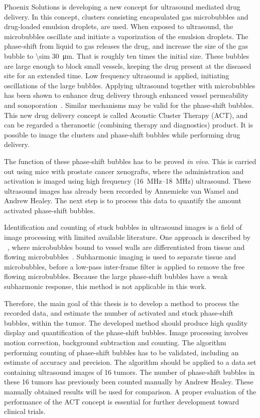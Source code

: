 Phoenix Solutions is developing a new concept for ultrasound mediated drug delivery. In this concept, clusters consisting encapsulated gas microbubbles and drug-loaded emulsion droplets, are used. When exposed to ultrasound, the microbubbles oscillate and initiate a vaporization of the emulsion droplets. The phase-shift from liquid to gas releases the drug, and increase the size of the gas bubble to \SI{\sim 30}{\micro\meter}. That is roughly ten times the initial size. These bubbles are large enough to block small vessels, keeping the drug present at the diseased site for an extended time. Low frequency ultrasound is applied, initiating oscillations of the large bubbles. Applying ultrasound together with microbubbles has been shown to enhance drug delivery through enhanced vessel permeability and sonoporation~\cite{VanWamel2006a}. Similar mechanisms may be valid for the phase-shift bubbles. This new drug delivery concept is called Acoustic Cluster Therapy (ACT\texttrademark{}), and can be regarded a theranostic (combining therapy and diagnostics) product. It is possible to image the clusters and phase-shift bubbles while performing drug delivery.

The function of these phase-shift bubbles has to be proved \textit{in vivo}. This is carried out using mice with prostate cancer xenografts, where the administration and activation is imaged using high frequency (\SIrange{16}{18}{\mega\hertz}) ultrasound. These ultrasound images has already been recorded by Annemieke van Wamel and Andrew Healey. The next step is to process this data to quantify the amount activated phase-shift bubbles.

Identification and counting of stuck bubbles in ultrasound images is a field of image processing with limited available literature. One approach is described by ~\citeauthor{Needles2009}, where microbubbles bound to vessel walls are differentiated from tissue and flowing microbubbles~\cite{Needles2009}. Subharmonic imaging is used to separate tissue and microbubbles, before a low-pass inter-frame filter is applied to remove the free flowing microbubbles. Because the large phase-shift bubbles have a weak subharmonic response, this method is not applicable in this work.

Therefore, the main goal of this thesis is to develop a method to process the recorded data, and estimate the number of activated and stuck phase-shift bubbles, within the tumor. The developed method should produce high quality display and quantification of the phase-shift bubbles. Image processing involves motion correction, background subtraction and counting. The algorithm performing counting of phase-shift bubbles has to be validated, including an estimate of accuracy and precision. The algorithm should be applied to a data set containing ultrasound images of 16 tumors. The number of phase-shift bubbles in these 16 tumors has previously been counted manually by Andrew Healey. These manually obtained results will be used for comparison. A proper evaluation of the performance of the ACT\texttrademark{} concept is essential for further development toward clinical trials.  








